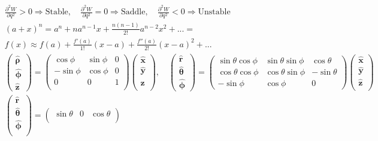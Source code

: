 \documentclass[10pt]{article}
\newcommand{\rhat}{\boldsymbol{\hat{\textbf{r}}}}
\newcommand{\xhat}{\boldsymbol{\hat{\textbf{x}}}}
\newcommand{\yhat}{\boldsymbol{\hat{\textbf{y}}}}
\newcommand{\zhat}{\boldsymbol{\hat{\textbf{z}}}}
\newcommand{\phihat}{\boldsymbol{\hat{\textbf{$\phi$}}}}
\newcommand{\thetahat}{\boldsymbol{\hat{\textbf{$\theta$}}}}
\newcommand{\rhohat}{\boldsymbol{\hat{\textbf{$\rho$}}}}
\newcommand{\dpder}[2]{\frac{\partial^2 #1}{\partial #2^2}}
\begin{document}
\begin{multicols}{2}
\begin{align*}
		& \dpder{W}{q} > 0 \Rightarrow \text{Stable}, \quad \dpder{W}{q} = 0 \Rightarrow \text{Saddle}, \quad \dpder{W}{q} < 0 \Rightarrow \text{Unstable} \\
		& (a + x)^n = a^n + n a^{n-1} x + \frac{n (n-1)}{2!} a^{n-2} x^2 + ... =  \tag*{Binomial Expansion} \\
		& f(x) \approx f(a) + \frac{f'(a)}{1!}(x-a) + \frac{f''(a)}{2!}(x-a)^2 + ...  \tag*{Taylor Series} \\
 		&\begin{pmatrix}
			\rhohat \\
			\phihat \\
			\zhat
 		\end{pmatrix} =
 		\begin{pmatrix}
 			\cos \phi & \sin \phi & 0 \\
 			-\sin \phi & \cos \phi & 0 \\
 			0 & 0 & 1 \\
 		\end{pmatrix} 
 		\begin{pmatrix}
 			\xhat \\
 			\yhat \\
 			\zhat \\
 		\end{pmatrix}, \quad
 		\begin{pmatrix}
			\rhat \\
			\thetahat \\
			\phihat
 		\end{pmatrix} =
 		\begin{pmatrix}
			\sin \theta \cos \phi & \sin \theta \sin \phi & \cos \theta\\
			\cos \theta \cos \phi & \cos \theta \sin \phi & - \sin \theta \\
			-\sin \phi & \cos \phi & 0
 		\end{pmatrix} 
 		\begin{pmatrix}
 			\xhat \\
 			\yhat \\
 			\zhat \\
 		\end{pmatrix} \\
 		& \begin{pmatrix}
 			\rhat \\
 			\thetahat \\
 			\phihat \\
 		\end{pmatrix} = 
 		\begin{pmatrix}
 			\sin \theta & 0 & \cos \theta \\

\end{pmatrix}
\end{align*}
\end{multicols}
\end{document}
